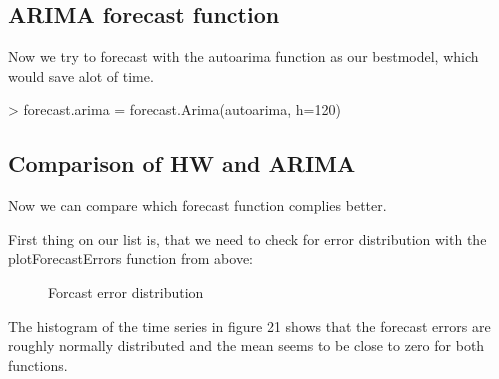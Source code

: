 \documentclass[10pt, a4paper]{article} %
\begin{document}
\subsection{ARIMA forecast function}
Now we try to forecast with the autoarima function as our bestmodel, which would save alot of time. 

\begin{Schunk}
\begin{Sinput}
> forecast.arima = forecast.Arima(autoarima, h=120) 
\end{Sinput}
\end{Schunk}

\subsection{Comparison of HW and ARIMA}
Now we can compare which forecast function complies better.

First thing on our list is, that we need to check for error distribution with the plotForecastErrors function from above:

\begin{figure}[ht]
\begin{center}
\qquad
{}
\end{center}
\caption{Forcast error distribution}
\label{forerr}
\end{figure}

\noindent The histogram  of the time series in figure 21 shows that the forecast errors are roughly normally distributed and the mean seems to be close to zero for both functions.\\
\end{document}

